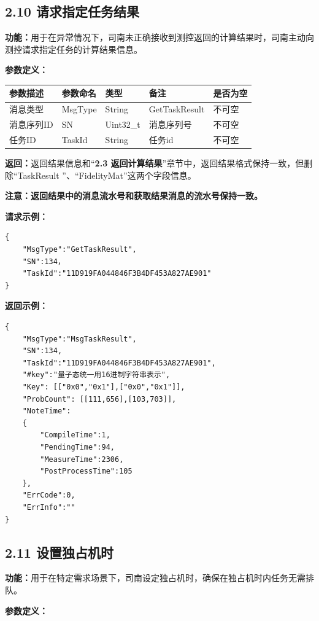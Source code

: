 \documentclass{ctexart}
\begin{document}
\subsection{2.10 请求指定任务结果}

\textbf{功能：}用于在异常情况下，司南未正确接收到测控返回的计算结果时，司南主动向测控请求指定任务的计算结果信息。

\textbf{参数定义：}

\begin{longtable}{|l|l|l|l|l|}
\hline
\textbf{\textbf{参数描述}} & \textbf{\textbf{参数命名}} & \textbf{\textbf{类型}} & \textbf{\textbf{备注}} & \textbf{\textbf{是否为空}} \\
\hline
消息类型 & MsgType & String & GetTaskResult & 不可空 \\
消息序列ID & SN & Uint32_t & 消息序列号 & 不可空 \\
任务ID & TaskId & String & 任务id & 不可空 \\
\hline
\end{longtable}

\textbf{返回：}返回结果信息和“\textbf{2.3 返回计算结果}”章节中，返回结果格式保持一致，但删除“TaskResult ”、“FidelityMat”这两个字段信息。

\textbf{注意：}\textbf{返回结果中的消息流水号和获取结果消息的流水号保持一致}\textbf{。}

\textbf{请求示例：}

\begin{verbatim}{
    "MsgType":"GetTaskResult",
    "SN":134，
    "TaskId":"11D919FA044846F3B4DF453A827AE901"
}\end{verbatim}
\textbf{返回示例：}
\begin{verbatim}{
    "MsgType":"MsgTaskResult",
    "SN":134,
    "TaskId":"11D919FA044846F3B4DF453A827AE901",
    "#key":"量子态统一用16进制字符串表示",
    "Key": [["0x0","0x1"],["0x0","0x1"]],
    "ProbCount": [[111,656],[103,703]],
    "NoteTime":
    {
        "CompileTime":1,
        "PendingTime":94,
        "MeasureTime":2306,
        "PostProcessTime":105
    },
    "ErrCode":0,
    "ErrInfo":""
}\end{verbatim}

\subsection{2.11 设置独占机时}

\textbf{功能：}用于在特定需求场景下，司南设定独占机时，确保在独占机时内任务无需排队。

\textbf{参数定义：}
\end{document}
